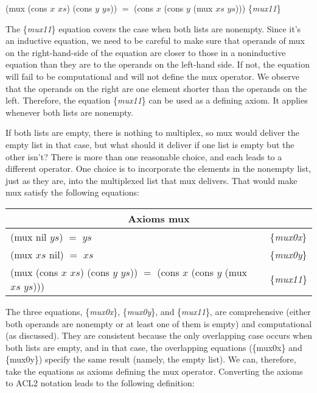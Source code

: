 \hspace{1cm} \textsf{(mux (cons $x$ $xs$) (cons $y$ $ys$)) $=$ (cons $x$ (cons $y$ (mux $xs$ $ys$)))}
\hfill \{\emph{mux11}\}

The \{\emph{mux11}\} equation covers the case when both lists are nonempty.
Since it's an inductive equation, we need to be careful to make sure
that operands of \textsf{mux} on the right-hand-side of the equation
are closer to those in a noninductive equation than they are
to the operands on the left-hand side.
If not, the equation will fail to be computational and
will not define the \textsf{mux} operator.
We observe that the operands on the right
are one element shorter than the operands on the left.
Therefore, the equation \{\emph{mux11}\} can be used
as a defining axiom. It applies whenever both lists are nonempty.

If both lists are empty, there is nothing to multiplex,
so \textsf{mux} would deliver the empty list in that case, but
what should it deliver if one list is empty but the other isn't?
There is more than one reasonable choice, and each leads to
a different operator. One choice is to incorporate the elements
in the nonempty list, just as they are, into the
multiplexed list that \textsf{mux}  delivers.
That would make \textsf{mux} satisfy the following equations:

\begin{center}
\begin{tabular}{ll}
\multicolumn{2}{c}{Axioms \textsf{mux} \label{axioms:mux}}\\
\hline
\textsf{(mux nil $ys$) $=$ $ys$}  & \{\emph{mux0x}\}     \\
\textsf{(mux $xs$ nil) $=$ $xs$}  & \{\emph{mux0y}\}     \\
\textsf{(mux (cons $x$ $xs$) (cons $y$ $ys$)) $=$ (cons $x$ (cons $y$ (mux $xs$ $ys$)))} & \{\emph{mux11}\} \\
\end{tabular}
\end{center}

\label{def:mux}The three equations, \{\emph{mux0x}\}, \{\emph{mux0y}\}, and \{\emph{mux11}\},
are comprehensive (either both operands are nonempty
or at least one of them is empty) and computational (as discussed).
They are consistent because the only overlapping case
occurs when both lists are empty, and in that case,
the overlapping equations
(\{mux0x\} and \{mux0y\}) specify the same result
(namely, the empty list).
We can, therefore, take the equations as axioms
defining the \textsf{mux} operator.
Converting the axioms to ACL2 notation leads to the following
definition:

